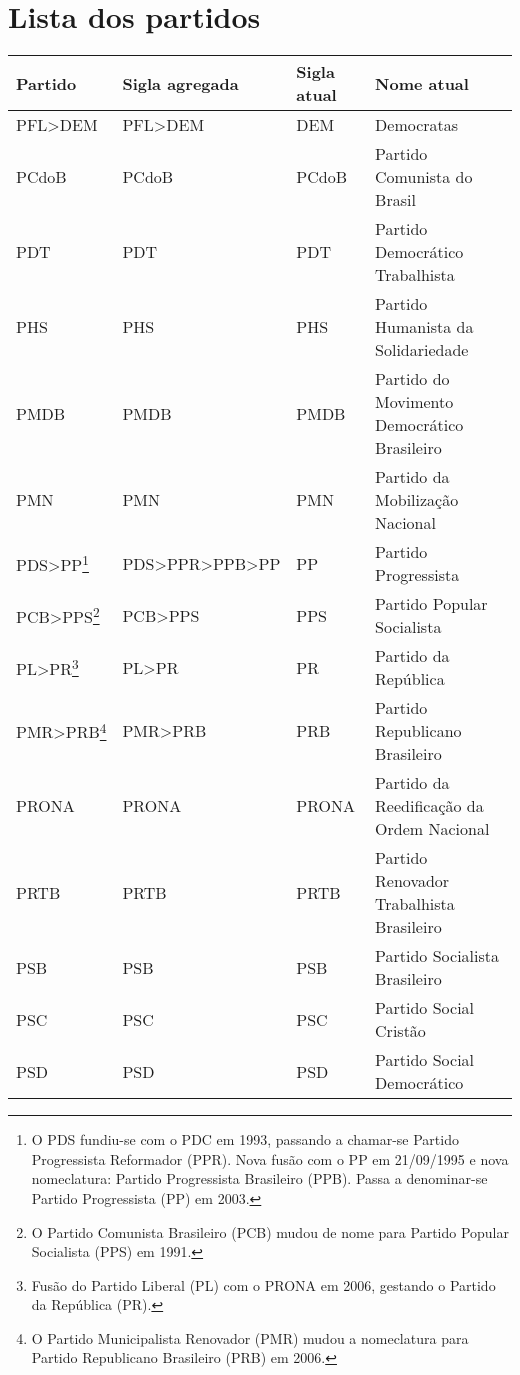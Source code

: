 
\chapter{Lista dos partidos}
\label{apendice:lista-partidos}

\begin{table}
\centering
\begin{tabular}{l l l l}
  Partido & Sigla agregada & Sigla atual & Nome atual \\
  \hline
  PFL>DEM & PFL>DEM & DEM & Democratas \\
  PCdoB & PCdoB & PCdoB & Partido Comunista do Brasil \\
  PDT & PDT & PDT & Partido Democrático Trabalhista \\
  PHS & PHS & PHS & Partido Humanista da Solidariedade \\
  PMDB & PMDB & PMDB & Partido do Movimento Democrático Brasileiro \\
  PMN & PMN & PMN & Partido da Mobilização Nacional \\
  PDS>PP\footnote{O PDS fundiu-se com o PDC em 1993, passando a chamar-se
Partido Progressista Reformador (PPR). Nova fusão com o PP em 21/09/1995 e nova
nomeclatura: Partido Progressista Brasileiro (PPB). Passa a denominar-se
Partido Progressista (PP) em 2003.} & PDS>PPR>PPB>PP & PP & Partido Progressista \\
  PCB>PPS\footnote{O Partido Comunista Brasileiro (PCB) mudou de nome para
Partido Popular Socialista (PPS) em 1991.} & PCB>PPS & PPS & Partido Popular Socialista \\
  PL>PR\footnote{Fusão do Partido Liberal (PL) com o PRONA em 2006, gestando o
Partido da República (PR).} & PL>PR & PR & Partido da República \\
  PMR>PRB\footnote{O Partido Municipalista Renovador (PMR) mudou a nomeclatura
para Partido Republicano Brasileiro (PRB) em 2006.} & PMR>PRB & PRB & Partido Republicano Brasileiro \\
  PRONA & PRONA & PRONA & Partido da Reedificação da Ordem Nacional \\
  PRTB & PRTB & PRTB & Partido Renovador Trabalhista Brasileiro \\
  PSB & PSB & PSB & Partido Socialista Brasileiro \\
  PSC & PSC & PSC & Partido Social Cristão \\
  PSD & PSD & PSD & Partido Social Democrático \\

\end{tabular}
\end{table}
